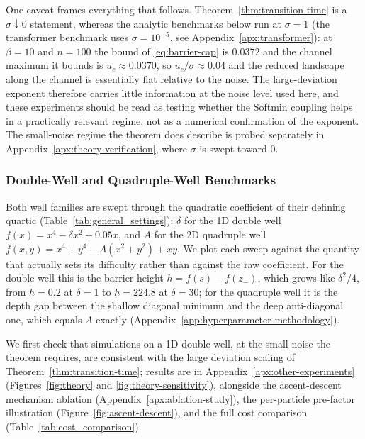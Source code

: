 \documentclass{article} %
\theoremstyle{plain}
\theoremstyle{definition}
\theoremstyle{remark}
\begin{document}
One caveat frames everything that follows. Theorem~\ref{thm:transition-time} is a $\sigma\downarrow0$ statement, whereas the analytic benchmarks below run at $\sigma=1$ (the transformer benchmark uses $\sigma=10^{-5}$, see Appendix~\ref{apx:transformer}): at $\beta=10$ and $n=100$ the bound of \eqref{eq:barrier-cap} is $0.0372$ and the channel maximum it bounds is $u_c\approx0.0370$, so $u_c/\sigma\approx0.04$ and the reduced landscape along the channel is essentially flat relative to the noise. The large-deviation exponent therefore carries little information at the noise level used here, and these experiments should be read as testing whether the Softmin coupling helps in a practically relevant regime, not as a numerical confirmation of the exponent. The small-noise regime the theorem does describe is probed separately in Appendix~\ref{apx:theory-verification}, where $\sigma$ is swept toward $0$.

\subsubsection{Double-Well and Quadruple-Well Benchmarks}
\label{apx:wells}

Both well families are swept through the quadratic coefficient of their defining quartic (Table~\ref{tab:general_settings}): $\delta$ for the 1D double well $f(x)=x^4-\delta x^2+0.05x$, and $A$ for the 2D quadruple well $f(x,y)=x^4+y^4-A(x^2+y^2)+xy$. We plot each sweep against the quantity that actually sets its difficulty rather than against the raw coefficient. For the double well this is the barrier height $h=f(s)-f(z_-)$, which grows like $\delta^2/4$, from $h=0.2$ at $\delta=1$ to $h=224.8$ at $\delta=30$; for the quadruple well it is the depth gap between the shallow diagonal minimum and the deep anti-diagonal one, which equals $A$ exactly (Appendix~\ref{app:hyperparameter-methodology}).

We first check that simulations on a 1D double well, at the small noise the theorem requires, are consistent with the large deviation scaling of Theorem~\ref{thm:transition-time}; results are in Appendix~\ref{apx:other-experiments} (Figures~\ref{fig:theory} and \ref{fig:theory-sensitivity}), alongside the ascent-descent mechanism ablation (Appendix~\ref{apx:ablation-study}), the per-particle pre-factor illustration (Figure~\ref{fig:ascent-descent}), and the full cost comparison (Table~\ref{tab:cost_comparison}).
\end{document}
